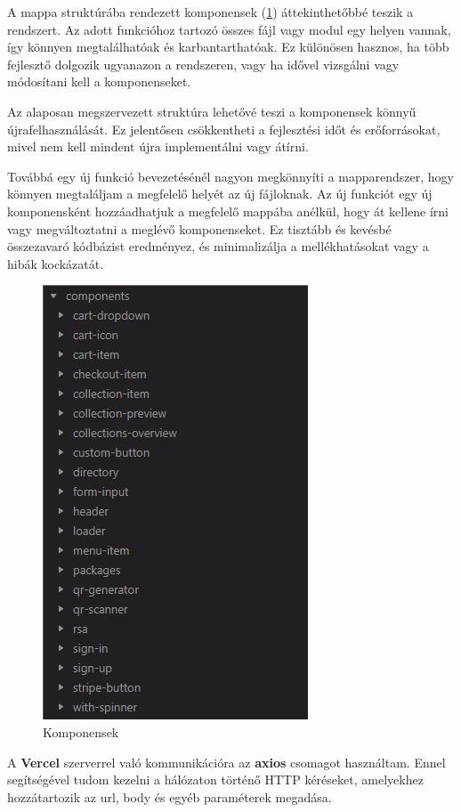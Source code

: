 A mappa struktúrába rendezett komponensek (\ref{abra:components}) áttekinthetőbbé teszik a rendszert. Az adott funkcióhoz tartozó összes fájl vagy modul egy helyen vannak, így könnyen megtalálhatóak és karbantarthatóak. Ez különösen hasznos, ha több fejlesztő dolgozik ugyanazon a rendszeren, vagy ha idővel vizsgálni vagy módosítani kell a komponenseket.

Az alaposan megszervezett struktúra lehetővé teszi a komponensek könnyű újrafelhasználását. Ez jelentősen csökkentheti a fejlesztési időt és erőforrásokat, mivel nem kell mindent újra implementálni vagy átírni.

Továbbá egy új funkció bevezetésénél nagyon megkönnyíti a mapparendszer, hogy könnyen megtaláljam a megfelelő helyét az új fájloknak. Az új funkciót egy új komponensként hozzáadhatjuk a megfelelő mappába anélkül, hogy át kellene írni vagy megváltoztatni a meglévő komponenseket. Ez tisztább és kevésbé összezavaró kódbázist eredményez, és minimalizálja a mellékhatásokat vagy a hibák kockázatát.

\begin{figure}[!h]
	\centering
	\includegraphics[scale=0.6]{images/components}
	\caption{Komponensek}
	\label{abra:components}
\end{figure}

A \textbf{Vercel} szerverrel való kommunikációra az \textbf{axios} csomagot használtam. Ennel segítségével tudom kezelni a hálózaton történő HTTP kéréseket, amelyekhez hozzátartozik az url, body és egyéb paraméterek megadása.

